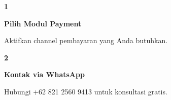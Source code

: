 \documentclass[a4paper]{article}
\begin{document}
\begin{center}
\begin{minipage}[t]{0.318\textwidth}
    \colorbox{BlueBg}{%
        \begin{minipage}{\dimexpr\linewidth-2\fboxsep\relax}
            \vspace{6pt}
            \begin{center}
                {\fontsize{22}{26}\selectfont\bfseries\color{BluePrimary} 1}
            \end{center}
            \vspace{2pt}
            \begin{center}
                {\fontsize{10}{13}\selectfont\bfseries\color{BlueDark} Pilih Modul Payment}\par\vspace{3pt}
                {\fontsize{9}{12}\selectfont\color{TextDark} Aktifkan channel pembayaran yang Anda butuhkan.}
            \end{center}
            \vspace{6pt}
        \end{minipage}}
\end{minipage}%
\hfill
\begin{minipage}[t]{0.318\textwidth}
    \colorbox{BlueBg}{%
        \begin{minipage}{\dimexpr\linewidth-2\fboxsep\relax}
            \vspace{6pt}
            \begin{center}
                {\fontsize{22}{26}\selectfont\bfseries\color{BluePrimary} 2}
            \end{center}
            \vspace{2pt}
            \begin{center}
                {\fontsize{10}{13}\selectfont\bfseries\color{BlueDark} Kontak via WhatsApp}\par\vspace{3pt}
                {\fontsize{9}{12}\selectfont\color{TextDark} Hubungi +62 821 2560 9413 untuk konsultasi gratis.}
            \end{center}
            \vspace{6pt}
        \end{minipage}}
\end{minipage}%
\hfill
\begin{minipage}[t]{0.318\textwidth}
    \colorbox{BlueBg}{%
        \begin{minipage}{\dimexpr\linewidth-2\fboxsep\relax}
            \vspace{6pt}

\end{minipage}}
\end{minipage}
\end{center}
\end{document}
